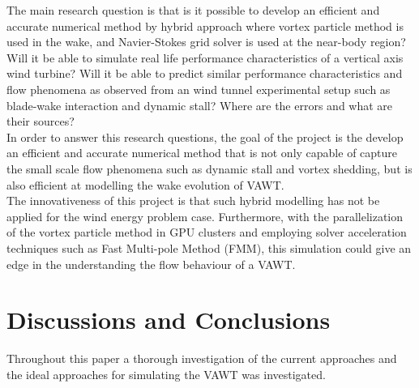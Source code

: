 


The main research question is that is it possible to develop an efficient and accurate numerical method by hybrid approach where vortex particle method is used in the wake, and Navier-Stokes grid solver is used at the near-body
region? Will it be able to simulate real life performance characteristics of a vertical axis wind turbine? Will it be able to predict similar performance characteristics and flow phenomena as observed from an wind tunnel experimental setup such as blade-wake interaction and dynamic stall? Where are the errors and what are their sources?\\

In order to answer this research questions, the goal of the project is the develop an efficient and accurate numerical method that is not only capable of capture the small scale flow phenomena such as dynamic stall and vortex shedding, but is also efficient at modelling the wake evolution of VAWT.\\

The innovativeness of this project is that such hybrid modelling has not be applied for the wind energy problem case. Furthermore, with the parallelization of the vortex particle method in GPU clusters and employing solver acceleration techniques such as Fast Multi-pole Method (FMM), this simulation could give an edge in the understanding the flow behaviour of a VAWT. 

\section{Discussions and Conclusions}	
\label{sec:conclusions}

Throughout this paper a thorough investigation of the current approaches and the ideal approaches for simulating the VAWT was investigated.\\

